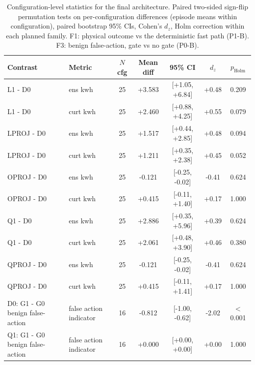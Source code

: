 \begin{table}[t]
\centering\small
\caption{Configuration-level statistics for the final architecture. Paired
two-sided sign-flip permutation tests on per-configuration differences
(episode means within configuration), paired bootstrap 95\% CIs, Cohen's
$d_z$, Holm correction within each planned family. F1: physical outcome vs
the deterministic fast path (P1-B). F3: benign false-action, gate vs no
gate (P0-B).}
\label{tab:stats-final}
\begin{tabular}{llccccc}
\toprule
Contrast & Metric & $N$ cfg & Mean diff & 95\% CI & $d_z$ & $p_{\text{Holm}}$ \\
\midrule
L1 - D0 & ens kwh & 25 & +3.583 & [+1.05, +6.84] & +0.48 & 0.209 \\
L1 - D0 & curt kwh & 25 & +2.460 & [+0.88, +4.25] & +0.55 & 0.079 \\
LPROJ - D0 & ens kwh & 25 & +1.517 & [+0.44, +2.85] & +0.48 & 0.094 \\
LPROJ - D0 & curt kwh & 25 & +1.211 & [+0.35, +2.38] & +0.45 & 0.052 \\
OPROJ - D0 & ens kwh & 25 & -0.121 & [-0.25, -0.02] & -0.41 & 0.624 \\
OPROJ - D0 & curt kwh & 25 & +0.415 & [-0.11, +1.40] & +0.17 & 1.000 \\
Q1 - D0 & ens kwh & 25 & +2.886 & [+0.35, +5.96] & +0.39 & 0.624 \\
Q1 - D0 & curt kwh & 25 & +2.061 & [+0.48, +3.90] & +0.46 & 0.380 \\
QPROJ - D0 & ens kwh & 25 & -0.121 & [-0.25, -0.02] & -0.41 & 0.624 \\
QPROJ - D0 & curt kwh & 25 & +0.415 & [-0.11, +1.41] & +0.17 & 1.000 \\
D0: G1 - G0 benign false-action & false action indicator & 16 & -0.812 & [-1.00, -0.62] & -2.02 & $<$0.001 \\
Q1: G1 - G0 benign false-action & false action indicator & 16 & +0.000 & [+0.00, +0.00] & +0.00 & 1.000 \\
\bottomrule
\end{tabular}
\end{table}
